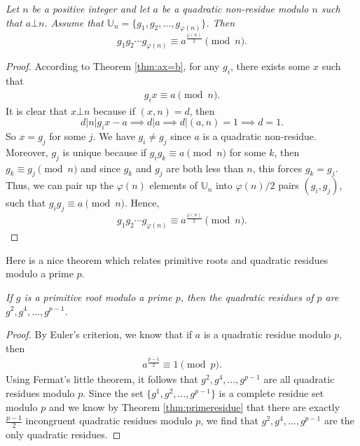 \documentclass{subfile}
\begin{document}
	\begin{theorem}\slshape\label{prd}
		Let $n$ be a positive integer and let $a$ be a quadratic non-residue modulo $n$ such that $a\bot n$. Assume that $\mathbb U_n = \{g_1, g_2, \ldots, g_{\varphi(n)}\}$. Then
		\[g_1g_2\cdots g_{\varphi(n)}\equiv a^{\frac{\varphi(n)}{2}}\pmod n.\]
	\end{theorem}
	
	\begin{proof}
		According to Theorem \ref{thm:ax=b}, for any $g_i$, there exists some $x$ such that
			\begin{align}
				g_i x\equiv a\pmod n.
			\end{align}
		It is clear that $x \bot n$ because if $(x,n)=d$, then
			\[d|n|g_ix - a \implies d|a \implies d|(a,n)=1 \implies d=1.\]
		So $x=g_j$ for some $j$. We have $g_i \neq g_j$ since $a$ is a quadratic non-residue. Moreover, $g_j$ is unique because if $g_ig_k \equiv a \pmod n$ for some $k$, then $g_k \equiv g_j \pmod n$ and since $g_k$ and $g_j$ are both less than $n$, this forces $g_k=g_j$. Thus, we can pair up the $\varphi(n)$ elements of $\mathbb{U}_n$ into $\varphi(n)/2$ pairs $(g_i, g_j)$, such that $g_ig_j \equiv a \pmod n$. Hence, 
			\begin{equation*}
			g_1g_2\cdots g_{\varphi(n)}\equiv a^{\frac{\varphi(n)}{2}}\pmod n.
			\end{equation*}
	\end{proof}
Here is a nice theorem which relates primitive roots and quadratic residues modulo a prime $p$.
	\begin{theorem}\slshape\label{thm:pr+qr}
		If $g$ is a primitive root modulo a prime $p$, then the quadratic residues of $p$ are $g^2,g^4,\ldots,g^{p-1}$.
	\end{theorem}

	\begin{proof}
		By Euler's criterion, we know that if $a$ is a quadratic residue modulo $p$, then
			\begin{align*}
				a^{\frac{p-1}{2}} \equiv 1 \pmod p.
			\end{align*}
		Using Fermat's little theorem, it follows that $g^2,g^4,\ldots,g^{p-1}$ are all quadratic residues modulo $p$. Since the set $\{g^1,g^2,\ldots,g^{p-1}\}$ is a complete residue set modulo $p$ and we know by Theorem \ref{thm:primeresidue} that there are exactly $\frac{p-1}{2}$ incongruent quadratic residues modulo $p$, we find that $g^2,g^4,\ldots,g^{p-1}$ are the only quadratic residues.
	\end{proof}
	
\end{document}
